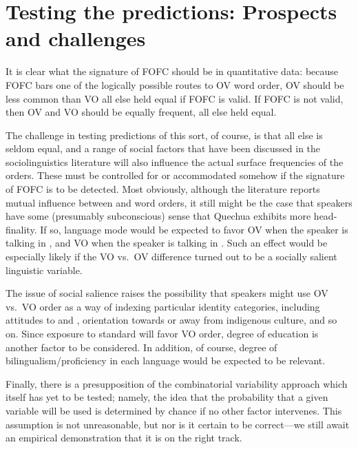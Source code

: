 \documentclass[output=paper]{langsci/langscibook}
\begin{document}
\section{Testing the predictions: Prospects and challenges}\label{sec-30:key:3}

It is clear what the signature of \gls{FOFC} should be in quantitative data: because
FOFC bars one of the logically possible routes to OV word order, OV should be
less common than VO all else held equal if \gls{FOFC} is valid.  If \gls{FOFC} is not
valid, then OV and VO should be equally frequent, all else held equal.

The challenge in testing predictions of this sort, of course, is that all else
is seldom equal, and a range of social factors that have been discussed in the
sociolinguistics literature will also influence the actual surface frequencies
of the orders.  These must be controlled for or accommodated somehow if the
signature of \gls{FOFC} is to be detected.  Most obviously, although the literature
reports mutual influence between  and  word orders, it still
might be the case that speakers have some (presumably subconscious) sense that
Quechua exhibits more head-finality. If so, language mode would be expected to
favor OV when the speaker is talking in , and VO when the speaker is
talking in .  Such an effect would be especially likely if the VO vs.\ OV
difference turned out to be a socially salient linguistic variable.

The issue of social salience raises the possibility that speakers might use OV
vs.\ VO order as a way of indexing particular identity categories, including
attitudes to  and , orientation towards or away from indigenous
culture, and so on.  Since exposure to standard  will favor VO order,
degree of education is another factor to be considered. In addition, of course,
degree of bilingualism/proficiency in each language would be expected to be
relevant.

Finally, there is a presupposition of the combinatorial variability approach
which itself has yet to be tested;  namely, the idea that the probability that
a given variable will be used is determined by chance if no other factor
intervenes.  This assumption is not unreasonable, but nor is it certain to be
correct—we still await an empirical demonstration that it is on the right
track.
\end{document}
